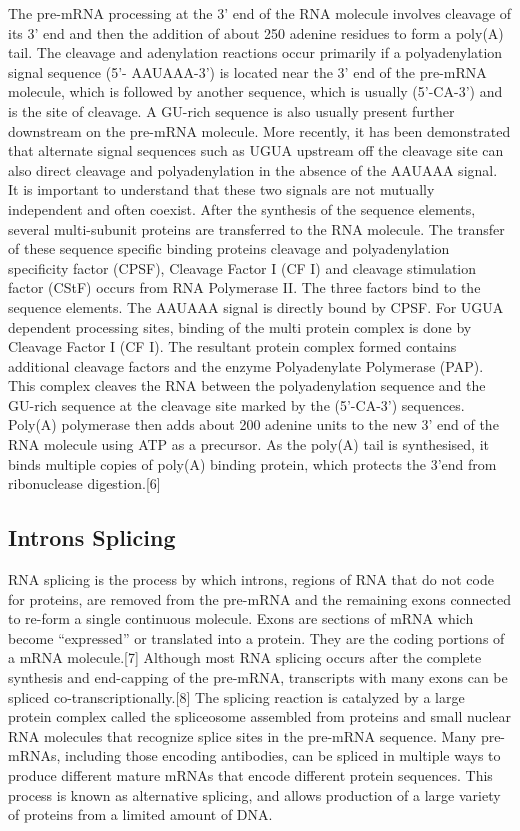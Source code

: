 The pre-mRNA processing at the 3' end of the RNA molecule involves cleavage of its 3' end and then the addition of about 250 adenine residues to form a poly(A) tail. The cleavage and adenylation reactions occur primarily if a polyadenylation signal sequence (5'- AAUAAA-3') is located near the 3' end of the pre-mRNA molecule, which is followed by another sequence, which is usually (5'-CA-3') and is the site of cleavage. A GU-rich sequence is also usually present further downstream on the pre-mRNA molecule. More recently, it has been demonstrated that alternate signal sequences such as UGUA upstream off the cleavage site can also direct cleavage and polyadenylation in the absence of the AAUAAA signal. It is important to understand that these two signals are not mutually independent and often coexist. After the synthesis of the sequence elements, several multi-subunit proteins are transferred to the RNA molecule. The transfer of these sequence specific binding proteins cleavage and polyadenylation specificity factor (CPSF), Cleavage Factor I (CF I) and cleavage stimulation factor (CStF) occurs from RNA Polymerase II. The three factors bind to the sequence elements. The AAUAAA signal is directly bound by CPSF. For UGUA dependent processing sites, binding of the multi protein complex is done by Cleavage Factor I (CF I). The resultant protein complex formed contains additional cleavage factors and the enzyme Polyadenylate Polymerase (PAP). This complex cleaves the RNA between the polyadenylation sequence and the GU-rich sequence at the cleavage site marked by the (5'-CA-3') sequences. Poly(A) polymerase then adds about 200 adenine units to the new 3' end of the RNA molecule using ATP as a precursor. As the poly(A) tail is synthesised, it binds multiple copies of poly(A) binding protein, which protects the 3'end from ribonuclease digestion.{[}6{]}

\hypertarget{introns-splicing}{%
\subsection{Introns Splicing}\label{introns-splicing}}

RNA splicing is the process by which introns, regions of RNA that do not code for proteins, are removed from the pre-mRNA and the remaining exons connected to re-form a single continuous molecule. Exons are sections of mRNA which become ``expressed'' or translated into a protein. They are the coding portions of a mRNA molecule.{[}7{]} Although most RNA splicing occurs after the complete synthesis and end-capping of the pre-mRNA, transcripts with many exons can be spliced co-transcriptionally.{[}8{]} The splicing reaction is catalyzed by a large protein complex called the spliceosome assembled from proteins and small nuclear RNA molecules that recognize splice sites in the pre-mRNA sequence. Many pre-mRNAs, including those encoding antibodies, can be spliced in multiple ways to produce different mature mRNAs that encode different protein sequences. This process is known as alternative splicing, and allows production of a large variety of proteins from a limited amount of DNA.

